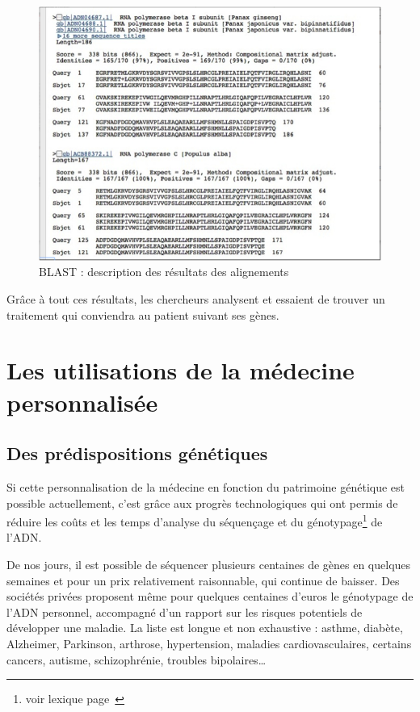 \documentclass[12pt, openany]{report}
\begin{document}
\begin{figure}[H]
\begin{center}
    \includegraphics[scale=1]{Images/im8.png}
\caption{BLAST : description des résultats des alignements}\label{fig:align}
\end{center}
\end{figure}

Grâce à tout ces résultats, les chercheurs analysent et essaient de trouver un traitement qui conviendra au patient suivant ses gènes.

\section{Les utilisations de la médecine personnalisée}

\subsection{Des prédispositions génétiques}

	Si cette personnalisation de la médecine en fonction du patrimoine génétique est possible actuellement, c’est grâce aux progrès technologiques qui ont permis de réduire les coûts et les temps d’analyse du séquençage  et du génotypage\footnote{voir lexique page~\pageref{lexique}} de l’ADN. 

De nos jours, il est possible de séquencer plusieurs centaines de gènes en quelques semaines et pour un prix relativement raisonnable, qui continue de baisser. Des sociétés privées proposent même pour quelques centaines d’euros le génotypage de l’ADN personnel, accompagné d’un rapport sur les risques potentiels de développer une maladie. La liste est longue et non exhaustive : asthme, diabète, Alzheimer, Parkinson, arthrose, hypertension, maladies cardiovasculaires, certains cancers, autisme, schizophrénie, troubles bipolaires\ldots
\end{document}
